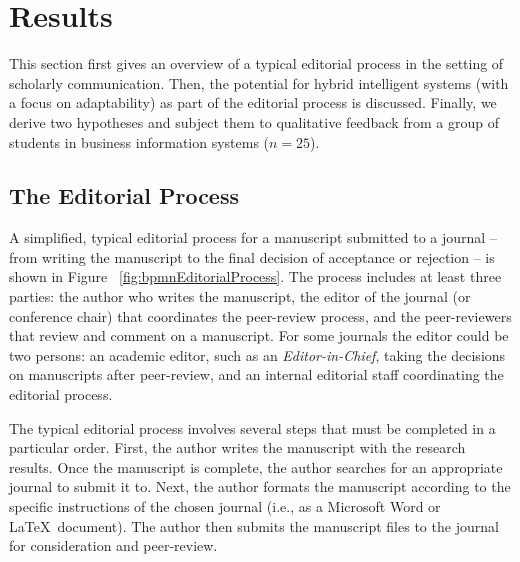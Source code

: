 \section{Results}
\label{sec:results}

This section first gives an overview of a typical editorial process in the setting of scholarly communication. Then, the potential
for hybrid intelligent systems (with a focus on adaptability) as part of the editorial process is discussed. Finally, we derive two
hypotheses and subject them to qualitative feedback from a group of students in business information systems ($n = 25$).

\subsection{The Editorial Process}

A simplified, typical editorial process for a manuscript submitted to a journal -- from writing the manuscript to the final decision of
acceptance or rejection -- is shown in Figure ~\ref{fig:bpmnEditorialProcess}. The process includes at least three parties: the author who
writes the manuscript, the editor of the journal (or conference chair) that coordinates the peer-review process, and the peer-reviewers
that review and comment on a manuscript. For some journals the editor could be two persons: an academic editor, such as an \textit{Editor-in-Chief},
taking the decisions on manuscripts after peer-review, and an internal editorial staff coordinating the editorial process.

The typical editorial process involves several steps that must be completed in a particular order. First, the author writes the manuscript
with the research results. Once the manuscript is complete, the author searches for an appropriate journal to submit it to. Next, the author
formats the manuscript according to the specific instructions of the chosen journal (i.e., as a Microsoft Word or \LaTeX~document). The author
then submits the manuscript files to the journal for consideration and peer-review. 

